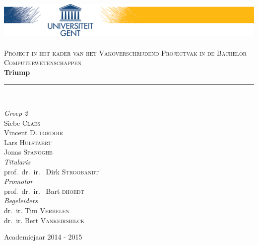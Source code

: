 \documentclass[a4paper,11.5pt]{report}
\newcommand{\HRule}{\rule{\linewidth}{0.5mm}}
\begin{document}



\begin{titlepage}
\begin{center}

\includegraphics[width=\linewidth]{ugent}~\\[2.5cm]

\textsc{Project in het kader van het Vakoverschrijdend Projectvak in de Bachelor Computerwetenschappen}\\[1.5cm]




{ \huge \bfseries Triump \\[0.4cm] }

\HRule \\[1.5cm]

\begin{minipage}{0.5\textwidth}
\begin{center} \large
\emph{Groep 2}\\
Siebe \textsc{Claes}\\
Vincent \textsc{Dutordoir}\\
Lars \textsc{Hulstaert}\\
Jonas \textsc{Spanoghe}\\[2.5cm]
\emph{Titularis}\\
prof.~dr.~ir.~ Dirk \textsc{Stroobandt}\\[0.2cm]
\emph{Promotor}\\
prof.~dr.~ir.~ Bart \textsc{dhoedt}\\[0.2cm]
\emph{Begeleiders}\\
dr.~ir. Tim \textsc{Verbelen}\\
dr.~ir. Bert \textsc{Vankeirsbilck}\\
\end{center}
\end{minipage}

\vfill

{\large Academiejaar 2014 - 2015}

\end{center}
\end{titlepage}
\end{document}
